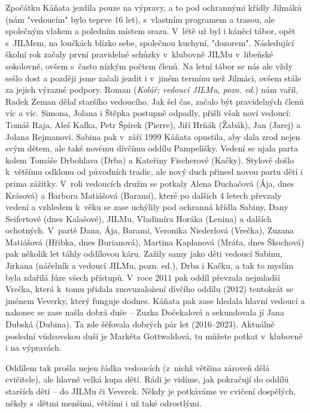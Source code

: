 \documentclass[a5paper, 11pt, twoside]{article}
\begin{document}
Zpočátku Káňata jezdila pouze na výpravy, a to pod ochrannými křídly
Jilmáků (nám "vedoucím" bylo teprve 16 let), s~vlastním programem a
trasou, ale společným vlakem a poledním místem srazu. V~létě už byl i
káněcí tábor, opět s~JILMem, na loučkách blízko sebe, společnou kuchyní,
"dozorem". Následující školní rok začaly první pravidelné schůzky
v~klubovně JILMu v~libeňské sokolovně, ovšem s~často nízkým počtem členů.
Na letní tábor se nás ale vždy sešlo dost a později jsme začali jezdit i
v~jiném termínu než Jilmáci, ovšem stále za jejich výrazné podpory.
Roman (\textit{Kolář; vedoucí JILMu, pozn. ed.}) nám vařil, Radek Zeman
dělal staršího vedoucího. Jak šel čas, začalo být pravidelných členů víc
a víc. Simona, Jolana i Štěpka postupně odpadly, přišli však noví
vedoucí: Tomáš Raja, Aleš Kafka, Petr Špírek (Pierre), Jiří Hrňák
(Žabák), Jan (Jarej) a Jolana Rejmanovi. Sabina pak v~září 1999 Káňata
opustila, aby dala zrod nejen svým dětem, ale také novému dívčímu oddílu
Pampelišky. Vedení se ujala parta kolem Tomáše Drbohlava (Drba) a
Kateřiny Fischerové (Kačky). Stylově došlo k~většímu odklonu od
původních tradic, ale nový duch přinesl novou partu dětí i prima
zážitky. V~roli vedoucích družin se potkaly Alena Duchačová (Ája, dnes
Krásová) a Barbora Matiášová (Barami), které po dalších 4 letech
převzaly vedení a vzhledem k~věku se zase uchýlily pod ochranná křídla
Sabiny, Dany Seifertové (dnes Kalašové), JILMu, Vladimíra Horáka
(Lenina) a dalších ochotných. V~partě Dana, Ája, Barami, Veronika
Niederlová (Vrečka), Zuzana Matiášová (Hřibka, dnes Burianová), Martina
Kaplanová (Mráťa, dnes Škochová) pak několik let táhly oddílovou káru.
Zažily samy jako děti vedoucí Sabinu, Jirkana (náčelník a vedoucí JILMu,
pozn. ed.), Drba i Kačku, a tak to myslím byla zdařilá fúze všech
přístupů. V~roce 2011 pak oddíl převzala nejmladší Vrečka, která k~tomu
přidala znovuzaložení dívčího oddílu (2012) tentokrát se jménem Veverky,
který funguje dodnes. Káňata pak zase hledala hlavní vedoucí a nakonec
se zase našla dobrá duše -- Zuzka Dočekalová a sekundovala jí Jana
Dubská (Dubina). Ta zde šéfovala dobrých pár let (2016--2023). Aktuálně
poslední vůdcovskou duší je Markéta Gottwaldová, tu můžete potkat
v~klubovně i na výpravách.

Oddílem tak prošla nejen řádka vedoucích (z~nichž většina zároveň dělá
cvičitele), ale hlavně velká kupa dětí. Rádi je vidíme, jak pokračují do
oddílů starších dětí -- do JILMu či Veverek. Někdy je potkáváme ve
cvičení dospělých, někdy s~dětmi menšími, většími i už také odrostlými.
\end{document}
